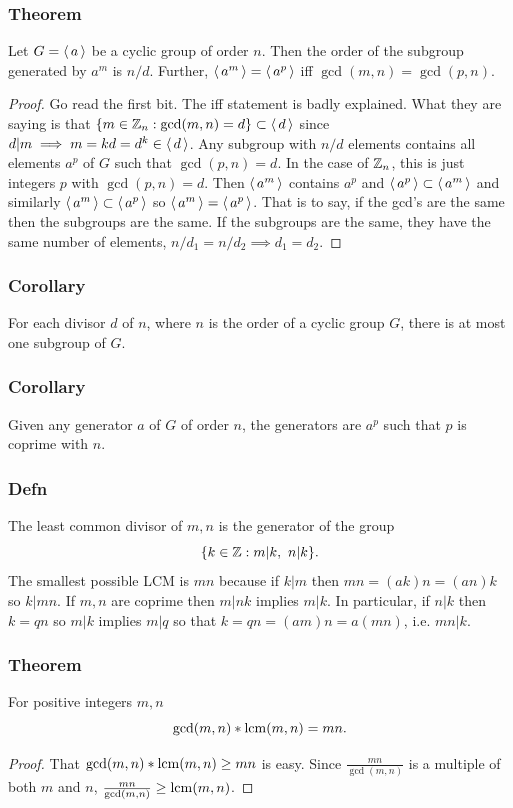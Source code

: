 \subsubsection*{Theorem}
Let $G = \operatorname{\langle} a \operatorname{\rangle}$ be a cyclic group of order $n$. Then the order of the subgroup generated by
$a^m$ is $n \slash d$. Further, $\operatorname{\langle} a^m \operatorname{\rangle} = \operatorname{\langle} a^p \operatorname{\rangle}$ iff $\gcd(m,n) = \gcd(p,n)$.
\begin{proof}
Go read the first bit. The iff statement is badly explained. What they are saying is that
$
\{m \in \operatorname{\mathbb{Z}}_n:\gcd(m,n) = d\} \subset \operatorname{\langle} d \operatorname{\rangle}
$
since $d \vert m \implies m = kd = d^k \in \operatorname{\langle} d \operatorname{\rangle}$. Any subgroup
with $n \slash d$ elements contains all elements $a^p$ of $G$ such that
$\gcd(p,n) = d$. In the case of $\operatorname{\mathbb{Z}}_n$, this is just integers $p$ with $\gcd(p,n) = d$.
Then $\operatorname{\langle} a^m \operatorname{\rangle}$ contains $a^p$ and $\operatorname{\langle} a^p \operatorname{\rangle} \subset \operatorname{\langle} a^m \operatorname{\rangle}$ and similarly $\operatorname{\langle} a^m \operatorname{\rangle} \subset \operatorname{\langle} a^p \operatorname{\rangle}$ so $\operatorname{\langle} a^m \operatorname{\rangle} = \operatorname{\langle} a^p \operatorname{\rangle}$. That is to say, if the gcd's are the same then the subgroups are the same.
If the subgroups are the same, they have the same number of elements, $n \slash d_1 = n \slash d_2 \implies d_1 = d_2$.
\end{proof}
\subsubsection*{Corollary}
For each divisor $d$ of $n$, where $n$ is the order of a cyclic group $G$, there is at most one subgroup of $G$.
\subsubsection*{Corollary}
Given any generator $a$ of $G$ of order $n$, the generators are $a^p$ such that $p$ is coprime with $n$.
\subsubsection*{Defn}
The least common divisor of $m,n$ is the generator of the group $$
\{k \in \operatorname{\mathbb{Z}}:m \vert k, \,\, n \vert k\}.
$$
The smallest possible LCM is $mn$ because if $k \vert m$ then $mn = (ak)n = (an)k$ so $k \vert mn$. If $m,n$ are coprime then $m \vert nk$ implies $m \vert k$. In particular,
if $n \vert k$ then $k = qn$ so $m \vert k$ implies $m \vert q$ so that $k = qn = (am)n = a(mn)$, i.e. $mn \vert k$.
\subsubsection*{Theorem}
For positive integers $m,n$
$$
\gcd(m,n) * \operatorname{lcm}(m,n) = mn.
$$
\begin{proof}
That $\gcd(m,n)*\operatorname{lcm}(m,n) \geq mn$ is easy. Since $\frac{mn}{\gcd(m,n)}$ is a multiple of both $m$ and $n$,
$\frac{mn}{\gcd(m,n)} \geq \operatorname{lcm}(m,n)$.
\end{proof}
